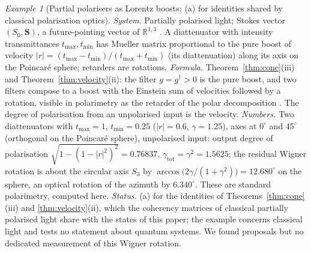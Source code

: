 \documentclass[aps,pra,onecolumn,superscriptaddress,nofootinbib,10pt]{revtex4-2}
\theoremstyle{definition}
\theoremstyle{remark}
\newtheorem{example}[theorem]{Example}
\begin{document}
\begin{example}[Partial polarisers as Lorentz boosts; (a) for identities shared by classical polarisation optics]\label{ex:boosts}
\emph{System.}  Partially polarised light; Stokes vector $(S_0,\mathbf S)$, a future-pointing vector of
$\mathbb R^{1,3}$ \cite{ex-HKN97}.  A diattenuator with intensity transmittances $t_{\max},t_{\min}$ has Mueller matrix
proportional to the pure boost of velocity $\lvert r\rvert=(t_{\max}-t_{\min})/(t_{\max}+t_{\min})$ (its
diattenuation) along its axis on the Poincar\'e sphere; retarders are rotations.
\emph{Formula.}  Theorem~\ref{thm:cone}(iii) and Theorem~\ref{thm:velocity}(ii): the filter $g=g^\dagger>0$ is the pure
boost, and two filters compose to a boost with the Einstein sum of velocities followed by a rotation,
visible in polarimetry as the retarder of the polar decomposition \cite{ex-LuChipman96}.  The degree of
polarisation from an unpolarised input is the velocity.
\emph{Numbers.}  Two diattenuators with $t_{\max}=1$, $t_{\min}=0.25$ ($\lvert r\rvert=0.6$, $\gamma=1.25$), axes at $0^\circ$ and
$45^\circ$ (orthogonal on the Poincar\'e sphere), unpolarised input: output degree of polarisation
$\sqrt{1-(1-\lvert r\rvert^2)^2}=0.76837$, $\gamma_{\mathrm{tot}}=\gamma^2=1.5625$; the residual Wigner rotation is about the
circular axis $S_3$ by $\arccos\bigl(2\gamma/(1+\gamma^2)\bigr)=12.680^\circ$ on the sphere, an optical rotation of the
azimuth by $6.340^\circ$.  These are standard polarimetry, computed here.
\emph{Status.}  (a) for the identities of Theorems~\ref{thm:cone}(iii) and \ref{thm:velocity}(ii), which the
coherency matrices of classical partially polarised light share with the states of this paper; the
example concerns classical light and tests no statement about quantum systems.  We found proposals
\cite{ex-HKN97} but no dedicated measurement of this Wigner rotation.
\end{example}
\end{document}
